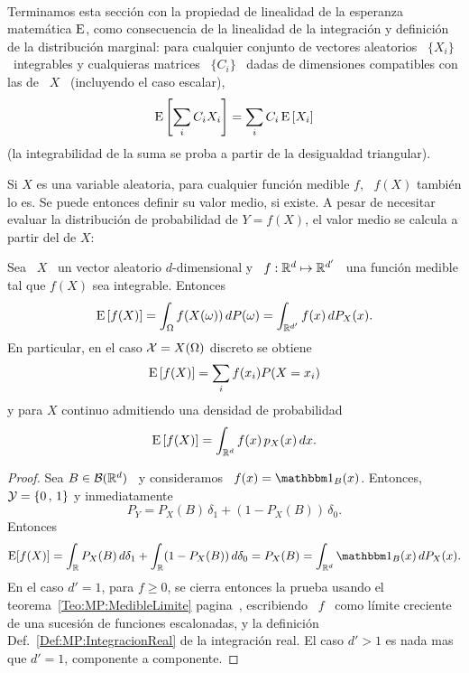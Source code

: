 \

Terminamos  esta  secci\'on con  la  propiedad  de  linealidad de  la  esperanza
matem\'atica $\operatorname{E}$,  como consecuencia de  la linealidad de la  integraci\'on y
definici\'on de la distribuci\'on  marginal: para cualquier conjunto de vectores
aleatorios \ $\{  X_i \}$ \ integrables  y cualquieras matrices \ $\{  C_i \}$ \
dadas  de  dimensiones compatibles  con  las  de \  $X$  \  (incluyendo el  caso
escalar),
%
\[
\operatorname{E}\left[ \sum_i C_i X_i \right] = \sum_i C_i \operatorname{E}\left[ X_i \right]
\]
%
(la integrabilidad de la suma se proba a partir de la desigualdad triangular).




\label{Ssec:MP:Momentos}

Si $X$ es una variable aleatoria, para cualquier funci\'on medible $f$, \ $f(X)$
tambi\'en lo es.   Se puede entonces definir su valor medio,  si existe. A pesar
de necesitar evaluar  la distribuci\'on de probabilidad de $Y  = f(X)$, el valor
medio se calcula a partir del de $X$:
%
\begin{teorema}
\label{Teo:MP:Transferencia}
%
  Sea  \ $X$  \ un  vector  aleatorio $d$-dimensional  y \  $f: \mathbb{R}^d  \mapsto
  \mathbb{R}^{d'}$ \ una funci\'on medible tal que $f(X)$ sea integrable. Entonces
  \[
  \operatorname{E}\left[   f(X)  \right]   =  \int_\Omega   f(X(\omega))  \,   dP(\omega)  =
  \int_{\mathbb{R}^{d'}} f(x) \, dP_X(x).
  \]
  En particular, en el caso $\mathcal{X} = X(\Omega)$ discreto se obtiene
  \[
  \operatorname{E}\left[ f(X) \right] = \sum_i f(x_i) P(X = x_i)
  \]
  y para $X$ continuo admitiendo una densidad de probabilidad
  \[
  \operatorname{E}\left[ f(X) \right] = \int_{\mathbb{R}^d} f(x) \, p_X(x) \, dx.
  \]
\end{teorema}
%
\begin{proof}
  Sea $B \in \mathcal{B}(\mathbb{R}^d)$ \ y consideramos \ $f(x) = \un_B(x)$. Entonces, $\mathcal{Y}
  = \{  0 \, , \,  1 \}$ y inmediatamente  \[P_Y = P_X(B) \, \delta_1 + (1-P_X(B))
  \, \delta_0.\] Entonces
  \[
  \Esp[f(X)]  =  \int_\Rset  P_X(B)  \,  d\delta_1 +  \int_\Rset  (1-P_X(B))  \,
  d\delta_0 = P_X(B) = \int_{\Rset^d} \un_B(x) \, dP_X(x).
  \]
  En el caso  $d' = 1$, para $f  \ge 0$, se cierra entonces la  prueba usando el
  teorema~\ref{Teo:MP:MedibleLimite}         pagina~\pageref{Teo:MP:MedibleLimite},
  escribiendo \  $f$ \  como l\'imite creciente  de una sucesi\'on  de funciones
  escalonadas,  y   la  definici\'on  Def.~\ref{Def:MP:IntegracionReal}   de  la
  integraci\'on real. El  caso $d' > 1$ es  nada mas que $d' =  1$, componente a
  componente.
\end{proof}

